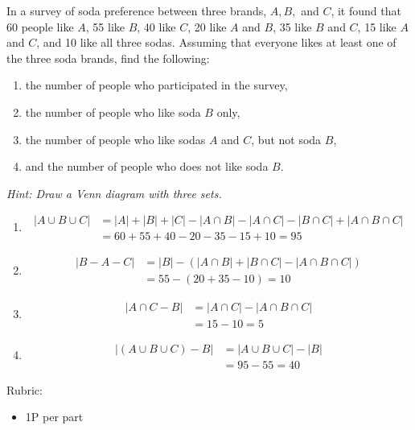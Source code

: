 \documentclass{article}
\theoremstyle{definition}
\begin{document}
\begin{question}{4}
   In a survey of soda preference between three brands, $A, B,$ and $C$, it found that 60 people like $A$, 55 like $B$, 40 like $C$, 20 like $A$ and $B$, 35 like $B$ and $C$, 15 like $A$ and $C$, and 10 like all three sodas. Assuming that everyone likes at least one of the three soda brands, find the following:
   \begin{enumerate}
   \item the number of people who participated in the survey,
   \item the number of people who like soda $B$ only,
   \item the number of people who like sodas $A$ and $C$, but not soda $B$, 
   \item and the number of people who does not like soda $B$.
   \end{enumerate}
   
   \textit{ Hint: Draw a Venn diagram with three sets.}
\end{question}
\begin{solution}
   \begin{enumerate}
   \item 
   \begin{align*}
   |A \cup B \cup C| & = |A| + |B| + |C| - |A\cap B| - |A\cap C| - |B\cap C| + |A\cap B \cap C| \\ 
   &= 60 + 55 + 40 - 20 - 35 - 15 + 10 = 95
   \end{align*}
   \item 
   \begin{align*}
   |B-A-C| &= |B| - (|A\cap B| + |B\cap C| - |A\cap B\cap C|)\\
   & = 55- (20 + 35 - 10) = 10
   \end{align*}
   \item 
   \begin{align*}
   |A\cap C - B| & = |A\cap C| - |A\cap B \cap C| \\
   & = 15 - 10 = 5
   \end{align*} 
   \item 
   \begin{align*}
   |(A\cup B\cup C) - B| &= |A\cup B\cup C| - |B|\\
   & = 95- 55 = 40
   \end{align*}
   \end{enumerate}

{\color{red} Rubric:
\begin{itemize}
\item 1P per part
\end{itemize}}
\end{solution}
\end{document}
